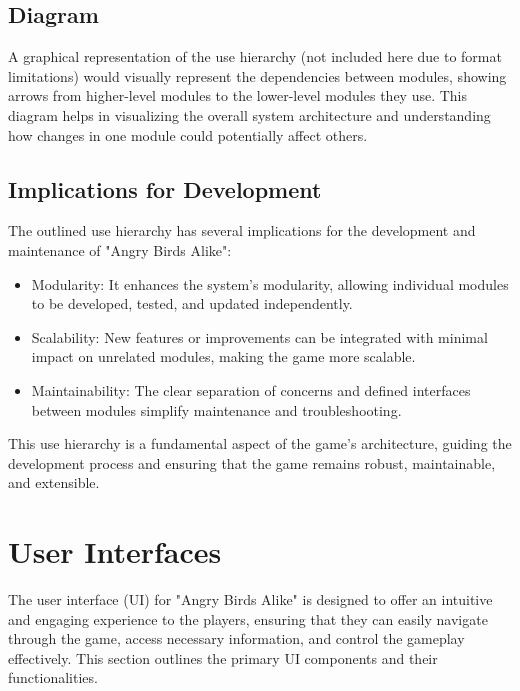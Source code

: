 \documentclass[12pt]{article}
\begin{document}
\subsection{Diagram}

A graphical representation of the use hierarchy (not included here due to format limitations) would visually represent the dependencies between modules, showing arrows from higher-level modules to the lower-level modules they use. This diagram helps in visualizing the overall system architecture and understanding how changes in one module could potentially affect others.

\subsection{Implications for Development}

The outlined use hierarchy has several implications for the development and maintenance of "Angry Birds Alike":
\begin{itemize}
    \item Modularity: It enhances the system's modularity, allowing individual modules to be developed, tested, and updated independently.
    \item Scalability: New features or improvements can be integrated with minimal impact on unrelated modules, making the game more scalable.
    \item Maintainability: The clear separation of concerns and defined interfaces between modules simplify maintenance and troubleshooting.
\end{itemize}

This use hierarchy is a fundamental aspect of the game's architecture, guiding the development process and ensuring that the game remains robust, maintainable, and extensible.

\section{User Interfaces}

The user interface (UI) for "Angry Birds Alike" is designed to offer an intuitive and engaging experience to the players, ensuring that they can easily navigate through the game, access necessary information, and control the gameplay effectively. This section outlines the primary UI components and their functionalities.
\end{document}
